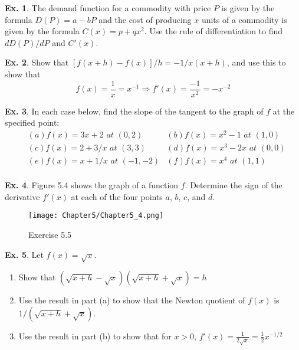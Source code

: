 \documentclass[10pt,a4paper]{book}
\theoremstyle{definition}\newtheorem{definition}{Definition}
\theoremstyle{definition}\newtheorem{fact}{Fact}
\theoremstyle{definition}\newtheorem{ex}{Ex.}
\theoremstyle{definition}\newtheorem{project}{Project}
\theoremstyle{definition}\newtheorem{problem}{Problem}
\theoremstyle{definition}\newtheorem{example}{Example}
\numberwithin{theorem}{chapter}
\numberwithin{corollary}{chapter}
\numberwithin{assumption}{chapter}
\numberwithin{definition}{chapter}
\numberwithin{prop}{chapter}
\numberwithin{notation}{chapter}
\numberwithin{problem}{chapter}
\numberwithin{example}{chapter}
\numberwithin{fact}{chapter}
\numberwithin{ex}{chapter}
\begin{document}
	\begin{ex}
		The demand function for a commodity with price $P$ is given by the formula $D(P) = a - bP$ and the cost of producing $x$ units of a commodity is given by the formula $C(x) = p + qx^2$. Use the rule of differentiation to find $dD(P)/dP$ and $C'(x)$.
	\end{ex}
	
	\begin{ex}
		Show that $[f(x + h) - f(x)]/h = -1/x(x + h)$, and use this to show that
		$$f(x)= \frac{1}{x} =x^{-1} \Rightarrow f'(x)=\frac{-1}{x^2} = -x^{-2}$$
	\end{ex}
	
	\begin{ex}
		In each case below, find the slope of the tangent to the graph of $f$ at the specified point:
		\begin{align*}
			& (a) f(x)=3x+2 \,\, at \,\,(0,2)    
			& (b) f(x)=x^2-1 \,\, at \,\,(1,0)   \\
			& (c) f(x)=2+3/x \,\, at \,\,(3,3)   
			& (d) f(x)=x^3-2x \,\, at \,\,(0,0)  \\
			& (e) f(x)=x+1/x \,\, at \,\,(-1,-2) 
			& (f) f(x)=x^4 \,\, at \,\,(1,1)     \\
		\end{align*}
	\end{ex}
	
	\begin{ex}
		Figure 5.4 shows the graph of a function $f$. Determine the sign of the derivative $f'(x)$ at each of the four points $a$, $b$, $c$, and $d$.
		\begin{figure}[ht]
			\centering
			\texttt{[image: Chapter5/Chapter5\_4.png]}
			\caption{Exercise 5.5}
		\end{figure}
	\end{ex}
	
	\begin{ex}
		Let $f(x)=\sqrt{x}$.
		\begin{enumerate}[label=(\alph*)]
			\item Show that $(\sqrt{x+h}-\sqrt{x})(\sqrt{x+h}+\sqrt{x})=h$
			\item Use the result in part (a) to show that the Newton quotient of $f(x)$ is $1/(\sqrt{x+h}+\sqrt{x})$.
			\item Use the result in part (b) to show that for $x>0$, $f'(x) = \frac{1}{2\sqrt{x}}=\frac{1}{2}x^{-1/2}$
		\end{enumerate}
	\end{ex}
	
\end{document}
